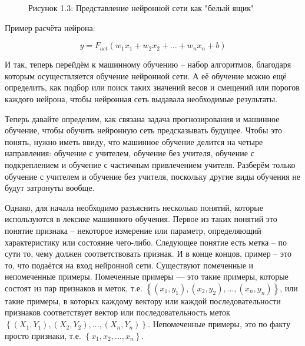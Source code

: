 {  \begin{figure}[htb]
    \centering
    \def\svgwidth{\textwidth}
    
    \caption*{\gostFont Рисунок 1.3: Представление нейронной сети как "белый ящик"}
    \label{fig:Neuron}
  \end{figure}

  \par \redline Пример расчёта нейрона:

  \begin{equation}
    y = F_{act}\left(w_1x_1 + w_2x_2 + \dots + w_nx_n + b\right)
  \end{equation}

  \par \redline И так, теперь перейдём к машинному обучению – набор алгоритмов, благодаря которым осуществляется обучение нейронной сети. А её обучение можно ещё определить, как подбор или поиск таких значений весов и смещений или порогов каждого нейрона, чтобы нейронная сеть выдавала необходимые результаты. 

  \par \redline Теперь давайте определим, как связана задача прогнозирования и машинное обучение, чтобы обучить нейронную сеть предсказывать будущее. Чтобы это понять, нужно иметь ввиду, что машинное обучение делится на четыре направления: обучение с учителем, обучение без учителя, обучение с подкреплением и обучение с частичным привлечением учителя. Разберём только обучение с учителем и обучение без учителя, поскольку другие виды обучения не будут затронуты вообще. 

  \par \redline Однако, для начала необходимо разъяснить несколько понятий, которые используются в лексике машинного обучения. Первое из таких понятий это понятие признака – некоторое измерение или параметр, определяющий характеристику или состояние чего-либо. Следующее понятие есть метка – по сути то, чему должен соответствовать признак.  И в конце концов, пример – это то, что подаётся на вход нейронной сети. Существуют помеченные и непомеченные примеры. Помеченные примеры — это такие примеры, которые состоят из пар признаков и меток, т.е. $\left\{\left(x_{1}, y_{1}\right), \left(x_{2}, y_{2}\right), \dots, \left(x_{n}, y_{n}\right)\right\}$, или такие примеры, в которых каждому вектору или каждой последовательности признаков соответствует вектор или последовательность меток $\left\{\left(X_{1}, Y_{1}\right), \left(X_{2}, Y_{2}\right), \dots, \left(X_{n}, Y_{n}\right)\right\}$. Непомеченные примеры, это по факту просто признаки, т.е. $\left\{x_{1}, x_{2}, \dots, x_{n}\right\}$. 

}
